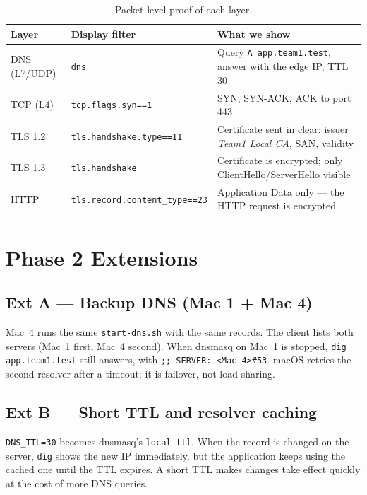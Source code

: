 \documentclass[11pt,a4paper]{article}
\newcommand{\cmd}[1]{\texttt{#1}}
\begin{document}
\begin{table}[h]
\centering
\begin{tabularx}{\textwidth}{l l X}
\toprule
\textbf{Layer} & \textbf{Display filter} & \textbf{What we show} \\
\midrule
DNS (L7/UDP) & \cmd{dns} & Query \cmd{A app.team1.test}, answer with the edge IP, TTL 30 \\
TCP (L4) & \cmd{tcp.flags.syn==1} & SYN, SYN-ACK, ACK to port 443 \\
TLS 1.2 & \cmd{tls.handshake.type==11} & Certificate sent in clear: issuer \emph{Team1 Local CA}, SAN, validity \\
TLS 1.3 & \cmd{tls.handshake} & Certificate is encrypted; only ClientHello/ServerHello visible \\
HTTP & \cmd{tls.record.content\_type==23} & Application Data only --- the HTTP request is encrypted \\
\bottomrule
\end{tabularx}
\caption{Packet-level proof of each layer.}
\end{table}

\section{Phase 2 Extensions}

\subsection{Ext A --- Backup DNS (Mac 1 + Mac 4)}
Mac~4 runs the same \cmd{start-dns.sh} with the same records. The client
lists both servers (Mac~1 first, Mac~4 second). When dnsmasq on Mac~1 is
stopped, \cmd{dig app.team1.test} still answers, with
\cmd{;; SERVER: <Mac 4>\#53}. macOS retries the second resolver after a
timeout; it is failover, not load sharing.

\subsection{Ext B --- Short TTL and resolver caching}
\cmd{DNS\_TTL=30} becomes dnsmasq's \cmd{local-ttl}. When the record is
changed on the server, \cmd{dig} shows the new IP immediately, but the
application keeps using the cached one until the TTL expires. A short TTL
makes changes take effect quickly at the cost of more DNS queries.
\end{document}
